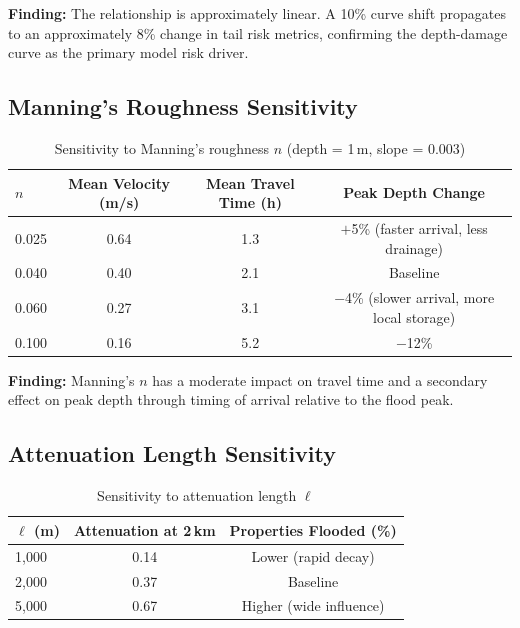\documentclass[11pt,a4paper]{article}
\begin{document}
\textbf{Finding:} The relationship is approximately linear. A 10\% curve shift propagates
to an approximately 8\% change in tail risk metrics, confirming the depth-damage curve as
the primary model risk driver.

\subsection{Manning's Roughness Sensitivity}

\begin{table}[H]
\centering
\begin{tabular}{lccc}
    \toprule
    $n$ & \textbf{Mean Velocity (m/s)} & \textbf{Mean Travel Time (h)} & \textbf{Peak Depth Change} \\
    \midrule
    0.025 & 0.64 & 1.3 & $+$5\% (faster arrival, less drainage) \\
    0.040 & 0.40 & 2.1 & Baseline \\
    0.060 & 0.27 & 3.1 & $-$4\% (slower arrival, more local storage) \\
    0.100 & 0.16 & 5.2 & $-$12\% \\
    \bottomrule
\end{tabular}
\caption{Sensitivity to Manning's roughness $n$ (depth = 1\,m, slope = 0.003)}
\label{tab:sens_manning}
\end{table}

\textbf{Finding:} Manning's $n$ has a moderate impact on travel time and a secondary
effect on peak depth through timing of arrival relative to the flood peak.

\subsection{Attenuation Length Sensitivity}

\begin{table}[H]
\centering
\begin{tabular}{lcc}
    \toprule
    $\ell$ (m) & \textbf{Attenuation at 2\,km} & \textbf{Properties Flooded (\%)} \\
    \midrule
    1{,}000  & 0.14 & Lower (rapid decay) \\
    2{,}000  & 0.37 & Baseline \\
    5{,}000  & 0.67 & Higher (wide influence) \\
    \bottomrule
\end{tabular}
\caption{Sensitivity to attenuation length $\ell$}
\label{tab:sens_atten}
\end{table}
\end{document}

